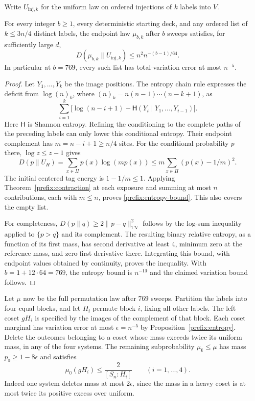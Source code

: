Write $U_{\mathrm{inj},k}$ for the uniform law on ordered injections
of $k$ labels into $V$.

\begin{proposition}\label{prefix:entropy}
For every integer $b\ge1$, every deterministic starting deck, and
any ordered list of $k\le3n/4$ distinct labels, the endpoint law
$\mu_{b,k}$ after $b$ sweeps satisfies, for sufficiently large $d$,
\begin{equation}\label{prefix:entropy-bound}
 D(\mu_{b,k}\|U_{\mathrm{inj},k})
          \le n^2 n^{-(b-1)/64}.
\end{equation}
In particular at $b=769$, every such list has total-variation error
at most $n^{-5}$.
\end{proposition}
\begin{proof}
Let $Y_1,\ldots,Y_k$ be the image positions.  The entropy chain rule
expresses the deficit from $\log(n)_k$, where
$(n)_k=n(n-1)\cdots(n-k+1)$, as
\[
 \sum_{i=1}^k\bigl[\log(n-i+1)-\mathsf H(Y_i\mid Y_1,\ldots,Y_{i-1})\bigr].
\]
Here $\mathsf H$ is Shannon entropy.  Refining the conditioning to
the complete paths of the preceding labels can only lower this
conditional entropy.  Their endpoint complement has
$m=n-i+1\ge n/4$ sites.  For the conditional probability $p$ there,
$\log z\le z-1$ gives
\[
 D(p\|U_H)=\sum_{x\in H}p(x)\log(mp(x))
              \le m\sum_{x\in H}(p(x)-1/m)^2.
\]
The initial centered tag energy is $1-1/m\le1$.  Applying
Theorem~\ref{prefix:contraction} at each exposure and summing at
most $n$ contributions, each with $m\le n$, proves
\eqref{prefix:entropy-bound}.  This also covers the empty list.

For completeness, $D(p\|q)\ge2\|p-q\|_{\mathrm{TV}}^2$ follows
by the log-sum inequality applied to $\{p>q\}$ and its complement.
The resulting binary relative entropy, as a function of its first
mass, has second derivative at least $4$, minimum zero at the
reference mass, and zero first derivative there.  Integrating this
bound, with endpoint values obtained by continuity, proves the
inequality.  With $b=1+12\cdot64=769$, the entropy bound is
$n^{-10}$ and the claimed variation bound follows.
\end{proof}

Let $\mu$ now be the full permutation law after $769$ sweeps.
Partition the labels into four equal blocks, and let $H_i$ permute
block $i$, fixing all other labels.  The left coset $gH_i$ is
specified by the images of the complement of that block.  Each coset
marginal has variation error at most $\epsilon=n^{-5}$ by
Proposition~\ref{prefix:entropy}.  Delete the outcomes belonging
to a coset whose mass exceeds twice its uniform mass, in any of the
four systems.  The remaining subprobability $\mu_0\le\mu$ has
mass $p_0\ge1-8\epsilon$ and satisfies
\begin{equation}\label{prefix:cap}
 \mu_0(gH_i)\le\frac2{[S_n:H_i]}\qquad(i=1,\ldots,4).
\end{equation}
Indeed one system deletes mass at most $2\epsilon$, since the mass
in a heavy coset is at most twice its positive excess over uniform.

